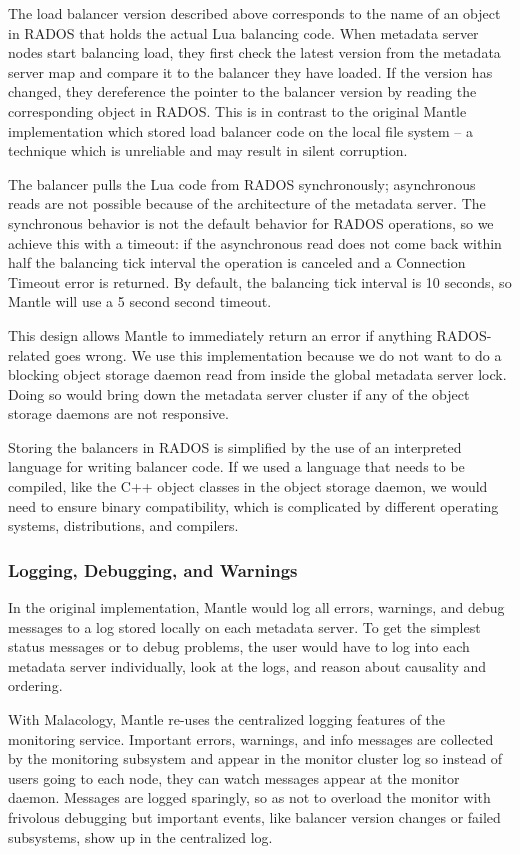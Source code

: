The load balancer version described above corresponds to the name of an object
in RADOS that holds the actual Lua balancing code.  When metadata server nodes
start balancing load, they first check the latest version from the metadata
server map and compare it to the balancer they have loaded. If the version has
changed, they dereference the pointer to the balancer version by reading the
corresponding object in RADOS. This is in contrast to the original Mantle
implementation which stored load balancer code on the local file system -- a
technique which is unreliable and may result in silent corruption.

The balancer pulls the Lua code from RADOS synchronously; asynchronous reads
are not possible because of the architecture of the metadata server. The
synchronous behavior is not the default behavior for RADOS operations, so we
achieve this with a timeout: if the asynchronous read does not come back within
half the balancing tick interval the operation is canceled and a Connection
Timeout error is returned. By default, the balancing tick interval is 10
seconds, so Mantle will use a 5 second second timeout.

This design allows Mantle to immediately return an error if anything
RADOS-related goes wrong.  We use this implementation because we do not want to
do a blocking object storage daemon read from inside the global metadata server
lock. Doing so would bring down the metadata server cluster if any of the
object storage daemons are not responsive.

Storing the balancers in RADOS is simplified by the use of an interpreted
language for writing balancer code. If we used a language that needs to be
compiled, like the C++ object classes in the object storage daemon, we would
need to ensure binary compatibility, which is complicated by different
operating systems, distributions, and compilers.

\subsubsection{Logging, Debugging, and Warnings}

In the original implementation, Mantle would log all errors, warnings, and
debug messages to a log stored locally on each metadata server. To get the
simplest status messages or to debug problems, the user would have to log into
each metadata server individually, look at the logs, and reason about causality
and ordering.

With Malacology, Mantle re-uses the centralized logging features of the
monitoring service. Important errors, warnings, and info messages are collected
by the monitoring subsystem and appear in the monitor cluster log so instead of
users going to each node, they can watch messages appear at the monitor daemon.
Messages are logged sparingly, so as not to overload the monitor with frivolous
debugging but important events, like balancer version changes or failed
subsystems, show up in the centralized log.

